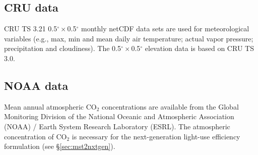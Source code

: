 \subsection{CRU data}
\label{sec:gepcru}
CRU TS 3.21 0.5$^{\circ}\times$0.5$^{\circ}$ monthly netCDF data sets are used for meteorological variables (e.g., max, min and mean daily air temperature; actual vapor pressure; precipitation and cloudiness). The 0.5$^{\circ}\times$0.5$^{\circ}$ elevation data is based on CRU TS 3.0.

\subsection{NOAA data}
\label{sec:gepnoaa}
Mean annual atmospheric CO$_2$ concentrations are available from the Global Monitoring Division of the National Oceanic and Atmospheric Association (NOAA) / Earth System Research Laboratory (ESRL)\footnotemark {}.  
The atmospheric concentration of CO$_2$ is necessary for the next-generation light-use efficiency formulation (see \S \ref{sec:mst2nxtgen}). 

